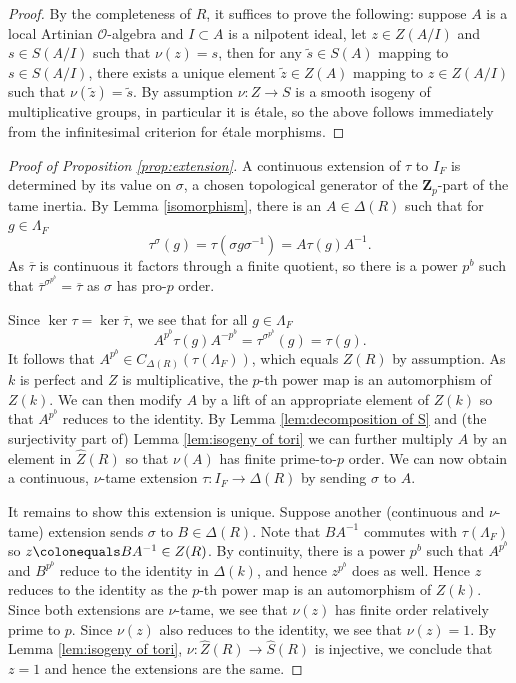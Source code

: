 \documentclass[11pt, letterpaper,english]{amsart}
\theoremstyle{plain}
\theoremstyle{definition}
\numberwithin{equation}{section}
\numberwithin{lem}{section}
\newcommand{\mathfont}{\mathbf}
\newcommand{\cO}{\mathcal{O}}
\DeclareMathOperator{\Ker}{ker}
\newcommand{\Zp}{\mathfont{Z}_p}
\newcommand{\taubar}{{\overline{\tau}}}
\newcommand{\cent}[2]{C_{#1}(#2)}
\newcommand{\Ld}{\Lambda}
\newcommand{\Dt}{\Delta}
\begin{document}
\begin{proof}
By the completeness of $R$, it suffices to prove the following: suppose $A$ is a local Artinian $\cO$-algebra and $I \subset A$ is a nilpotent ideal, let $z \in Z(A/I)$ and $s \in S(A/I)$ such that $\nu(z)=s$, then for any $\tilde s \in S(A)$ mapping to $s \in S(A/I)$, there exists a unique element $\tilde z \in Z(A)$ mapping to $z \in Z(A/I)$ such that $\nu(\tilde z)=\tilde s$. By assumption $\nu \colon Z \to S$ is a smooth isogeny of multiplicative groups, in particular it is \'etale, so the above follows immediately from the infinitesimal criterion for \'etale morphisms. 
\end{proof}


\begin{proof}[Proof of Proposition \ref{prop:extension}]
A continuous extension of $\tau$ to $I_F$ is determined by its value on $\sigma$, a chosen topological generator of the $\Zp$-part of the tame inertia. By Lemma \ref{isomorphism}, there is an $A \in \Dt(R)$ such that for $g \in \Ld_F$ 
\[ \tau^\sigma(g) = \tau(\sigma g\sigma^{-1})=A\tau(g)A^{-1}. \]
As $\taubar$ is continuous it factors through a finite quotient, so there is a power $p^b$ such that $\taubar^{\sigma^{p^b}}=\taubar$ as $\sigma$ has pro-$p$ order.

Since $\Ker\tau=\ker\taubar$, we see that for all $g \in \Lambda_F$
\[
A^{p^b}\tau(g) A^{-p^b}=\tau^{\sigma^{p^b}}(g)=\tau(g).
\] 
It follows that $A^{p^b} \in \cent{\Dt(R)}{\tau(\Ld_F)}$, which equals $Z(R)$ by assumption. 
As $k$ is perfect and $Z$ is multiplicative,
the $p$-th power map is an automorphism of $Z(k)$.  
We can then modify $A$ by a lift of an appropriate element of $Z(k)$ 
so that $A^{p^b}$ reduces to the identity.  
By Lemma \ref{lem:decomposition of S} and (the surjectivity part of) Lemma \ref{lem:isogeny of tori} we can further multiply $A$ by an element in $\widehat{Z}(R)$ so that $\nu(A)$ has finite prime-to-$p$ order.
We can now obtain a continuous, $\nu$-tame extension $\tau : I_F \to \Delta(R)$ by sending $\sigma$ to $A$.

It remains to show this extension is unique.  Suppose another (continuous and $\nu$-tame) extension sends $\sigma$ to $B \in \Dt(R)$.  Note that $BA^{-1}$ commutes with $\tau(\Lambda_F)$ so $z\colonequals BA^{-1} \in Z(R)$. By continuity, there is a power $p^b$ such that $A^{p^b}$ and $B^{p^b}$ reduce to the identity
in $\Delta(k)$,
and hence $z^{p^b}$ does as well.  Hence $z$ reduces to the identity as the $p$-th power map is an automorphism of $Z(k)$. Since both extensions are $\nu$-tame, we see that $\nu(z)$ has finite order relatively prime to $p$. Since $\nu(z)$ also reduces to the identity, we see that $\nu(z)=1$. By Lemma \ref{lem:isogeny of tori}, $\nu: \widehat{Z}(R) \to \widehat{S}(R)$ is injective, we conclude that $z=1$ and hence the extensions are the same. 
\end{proof}
\end{document}
